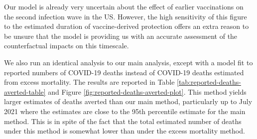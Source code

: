 \documentclass{article}
\begin{document}
Our model is already very uncertain about the effect of earlier vaccinations on the second infection wave in the US. However, the high sensitivity of this figure to the estimated duration of vaccine-derived protection offers an extra reason to be unsure that the model is providing us with an accurate assessment of the counterfactual impacts on this timescale.

We also run an identical analysis to our main analysis, except with a model fit to reported numbers of COVID-19 deaths instead of COVID-19 deaths estimated from excess mortality. The results are reported in Table \ref{tab:reported-deaths-averted-table} and Figure \ref{fig:reported-deaths-averted-plot}. This method yields larger estimates of deaths averted than our main method, particularly up to July 2021 where the estimates are close to the 95th percentile estimate for the main method. This is in spite of the fact that the total estimated number of deaths under this method is somewhat lower than under the excess mortality method.
\end{document}
